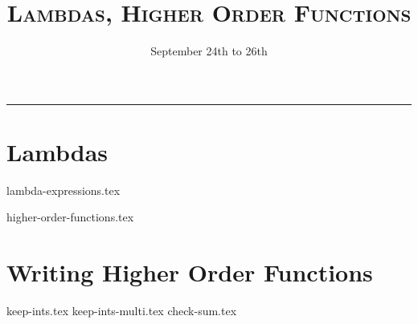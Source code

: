 \documentclass{exam}
\title{\textsc{Lambdas, Higher Order Functions}}
\date{September 24th to 26th}
\begin{document}
\maketitle
\rule{\textwidth}{0.15em}
\fontsize{12}{15}\selectfont


\section{Lambdas}
{lambda-expressions.tex}
\newpage
\begin{questions}
{higher-order-functions.tex}
\newpage
\section{Writing Higher Order Functions}
\vspace{-1.5em}
{keep-ints.tex}
{keep-ints-multi.tex}
{check-sum.tex}

\end{questions}
\end{document}
